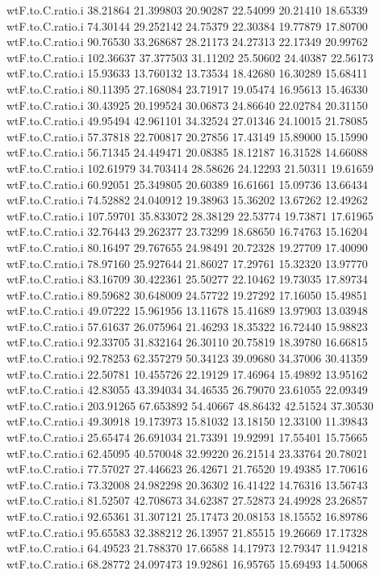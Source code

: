 \documentclass[11pt]{article} %
\begin{document}
\begin{Schunk}
\begin{Soutput}
wtF.to.C.ratio.i  38.21864 21.399803 20.90287 22.54099 20.21410 18.65339
wtF.to.C.ratio.i  74.30144 29.252142 24.75379 22.30384 19.77879 17.80700
wtF.to.C.ratio.i  90.76530 33.268687 28.21173 24.27313 22.17349 20.99762
wtF.to.C.ratio.i 102.36637 37.377503 31.11202 25.50602 24.40387 22.56173
wtF.to.C.ratio.i  15.93633 13.760132 13.73534 18.42680 16.30289 15.68411
wtF.to.C.ratio.i  80.11395 27.168084 23.71917 19.05474 16.95613 15.46330
wtF.to.C.ratio.i  30.43925 20.199524 30.06873 24.86640 22.02784 20.31150
wtF.to.C.ratio.i  49.95494 42.961101 34.32524 27.01346 24.10015 21.78085
wtF.to.C.ratio.i  57.37818 22.700817 20.27856 17.43149 15.89000 15.15990
wtF.to.C.ratio.i  56.71345 24.449471 20.08385 18.12187 16.31528 14.66088
wtF.to.C.ratio.i 102.61979 34.703414 28.58626 24.12293 21.50311 19.61659
wtF.to.C.ratio.i  60.92051 25.349805 20.60389 16.61661 15.09736 13.66434
wtF.to.C.ratio.i  74.52882 24.040912 19.38963 15.36202 13.67262 12.49262
wtF.to.C.ratio.i 107.59701 35.833072 28.38129 22.53774 19.73871 17.61965
wtF.to.C.ratio.i  32.76443 29.262377 23.73299 18.68650 16.74763 15.16204
wtF.to.C.ratio.i  80.16497 29.767655 24.98491 20.72328 19.27709 17.40090
wtF.to.C.ratio.i  78.97160 25.927644 21.86027 17.29761 15.32320 13.97770
wtF.to.C.ratio.i  83.16709 30.422361 25.50277 22.10462 19.73035 17.89734
wtF.to.C.ratio.i  89.59682 30.648009 24.57722 19.27292 17.16050 15.49851
wtF.to.C.ratio.i  49.07222 15.961956 13.11678 15.41689 13.97903 13.03948
wtF.to.C.ratio.i  57.61637 26.075964 21.46293 18.35322 16.72440 15.98823
wtF.to.C.ratio.i  92.33705 31.832164 26.30110 20.75819 18.39780 16.66815
wtF.to.C.ratio.i  92.78253 62.357279 50.34123 39.09680 34.37006 30.41359
wtF.to.C.ratio.i  22.50781 10.455726 22.19129 17.46964 15.49892 13.95162
wtF.to.C.ratio.i  42.83055 43.394034 34.46535 26.79070 23.61055 22.09349
wtF.to.C.ratio.i 203.91265 67.653892 54.40667 48.86432 42.51524 37.30530
wtF.to.C.ratio.i  49.30918 19.173973 15.81032 13.18150 12.33100 11.39843
wtF.to.C.ratio.i  25.65474 26.691034 21.73391 19.92991 17.55401 15.75665
wtF.to.C.ratio.i  62.45095 40.570048 32.99220 26.21514 23.33764 20.78021
wtF.to.C.ratio.i  77.57027 27.446623 26.42671 21.76520 19.49385 17.70616
wtF.to.C.ratio.i  73.32008 24.982298 20.36302 16.41422 14.76316 13.56743
wtF.to.C.ratio.i  81.52507 42.708673 34.62387 27.52873 24.49928 23.26857
wtF.to.C.ratio.i  92.65361 31.307121 25.17473 20.08153 18.15552 16.89786
wtF.to.C.ratio.i  95.65583 32.388212 26.13957 21.85515 19.26669 17.17328
wtF.to.C.ratio.i  64.49523 21.788370 17.66588 14.17973 12.79347 11.94218
wtF.to.C.ratio.i  68.28772 24.097473 19.92861 16.95765 15.69493 14.50068

\end{Soutput}
\end{Schunk}
\end{document}
